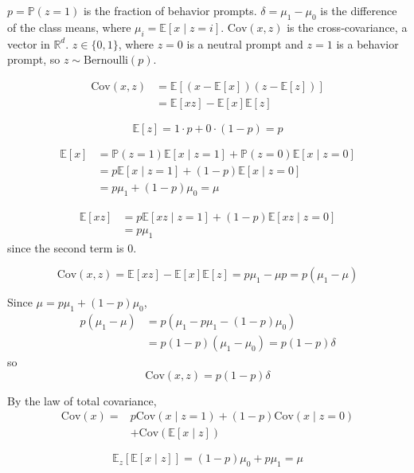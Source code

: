 \documentclass[10pt,a4paper,twocolumn]{article}
\newcommand{\R}{\mathbb{R}}
\begin{document}
	$p = \mathbb{P}(z = 1)$ is the fraction of behavior prompts. $\delta = \mu_1 - \mu_0$ is the difference of the class means, where $\mu_i = \mathbb{E}[x \mid z = i]$. $\mathrm{Cov}(x, z)$ is the cross-covariance, a vector in $\R^d$. $z \in \{0, 1\}$, where $z = 0$ is a neutral prompt and $z = 1$ is a behavior prompt, so $z \sim \mathrm{Bernoulli}(p)$.

	$$\begin{aligned}
		\mathrm{Cov}(x, z) & = \mathbb{E} \left[ (x - \mathbb{E}[x]) (z - \mathbb{E}[z]) \right] \\
		& = \mathbb{E}[x z] - \mathbb{E}[x] \mathbb{E}[z]
	\end{aligned}$$

	$$\mathbb{E}[z] = 1 \cdot p + 0 \cdot (1 - p) = p$$

	$$\begin{aligned}
		\mathbb{E}[x] & = \mathbb{P}(z = 1) \mathbb{E}[x \mid z = 1] + \mathbb{P}(z = 0) \mathbb{E}[x \mid z = 0] \\
		& = p \mathbb{E}[x \mid z = 1] + (1 - p) \mathbb{E}[x \mid z = 0] \\
		& = p \mu_1 + (1 - p) \mu_0 = \mu
	\end{aligned}$$

	$$\begin{aligned}
		\mathbb{E}[x z] & = p \mathbb{E}[x z \mid z = 1] + (1 - p) \mathbb{E}[x z \mid z = 0] \\
		& = p \mu_1
	\end{aligned}$$
	since the second term is $0$.

	$$\mathrm{Cov}(x, z) = \mathbb{E}[x z] - \mathbb{E}[x] \mathbb{E}[z] = p \mu_1 - \mu p = p (\mu_1 - \mu)$$

	Since $\mu = p \mu_1 + (1 - p) \mu_0$,
	$$\begin{aligned}
		p (\mu_1 - \mu) & = p \left( \mu_1 - p \mu_1 - (1 - p) \mu_0 \right) \\
		& = p (1 - p) (\mu_1 - \mu_0) = p (1 - p) \delta
	\end{aligned}$$
	so
	$$\mathrm{Cov}(x, z) = p (1 - p) \delta$$

	By the law of total covariance,
	$$\begin{aligned}
		\mathrm{Cov}(x) = {} & p \mathrm{Cov}(x \mid z = 1) + (1 - p) \mathrm{Cov}(x \mid z = 0) \\
		& + \mathrm{Cov}(\mathbb{E}[x \mid z])
	\end{aligned}$$

	$$\mathbb{E}_z \left[ \mathbb{E}[x \mid z] \right] = (1 - p) \mu_0 + p \mu_1 = \mu$$
\end{document}
